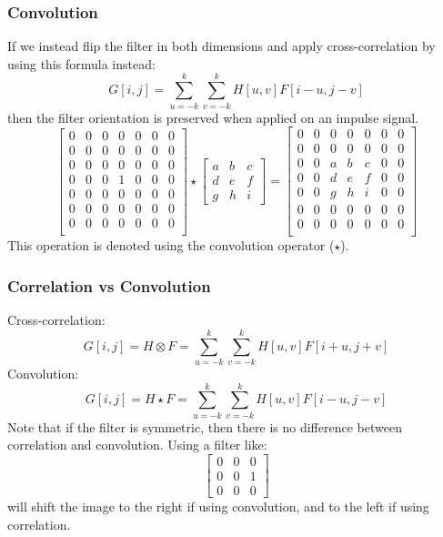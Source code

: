 \documentclass{math}
\begin{document}
\subsubsection*{Convolution}
If we instead flip the filter in both dimensions and apply cross-correlation
by using this formula instead:
\[ G[i,j] = \sum_{u=-k}^{k}\sum_{v=-k}^{k}H[u,v]F[i-u,j-v] \]
then the filter orientation is preserved when applied on an impulse signal.
\[ \begin{bmatrix}
  0 & 0 & 0 & 0 & 0 & 0 & 0 \\
  0 & 0 & 0 & 0 & 0 & 0 & 0 \\
  0 & 0 & 0 & 0 & 0 & 0 & 0 \\
  0 & 0 & 0 & 1 & 0 & 0 & 0 \\
  0 & 0 & 0 & 0 & 0 & 0 & 0 \\
  0 & 0 & 0 & 0 & 0 & 0 & 0 \\
  0 & 0 & 0 & 0 & 0 & 0 & 0 \\
\end{bmatrix}\star\begin{bmatrix}
  a & b & c \\
  d & e & f \\
  g & h & i
\end{bmatrix} = \begin{bmatrix}
  0 & 0 & 0 & 0 & 0 & 0 & 0 \\
  0 & 0 & 0 & 0 & 0 & 0 & 0 \\
  0 & 0 & a & b & c & 0 & 0 \\
  0 & 0 & d & e & f & 0 & 0 \\
  0 & 0 & g & h & i & 0 & 0 \\
  0 & 0 & 0 & 0 & 0 & 0 & 0 \\
  0 & 0 & 0 & 0 & 0 & 0 & 0 \\
\end{bmatrix} \]
This operation is denoted using the convolution operator (\( \star \)).

\subsubsection*{Correlation vs Convolution}
Cross-correlation:
\[ G[i,j] = H\otimes F = \sum_{u=-k}^{k}\sum_{v=-k}^{k}H[u,v]F[i+u,j+v] \]
Convolution:
\[ G[i,j] = H\star F = \sum_{u=-k}^{k}\sum_{v=-k}^{k}H[u,v]F[i-u,j-v] \]
Note that if the filter is symmetric, then there is no difference between
correlation and convolution. Using a filter like:
\[ \begin{bmatrix}
  0 & 0 & 0 \\
  0 & 0 & 1 \\
  0 & 0 & 0
\end{bmatrix} \]
will shift the image to the right if using convolution, and to the left if using
correlation.
\end{document}
